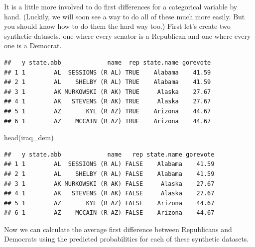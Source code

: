 \documentclass[
  12pt,
  oneside,openany]{book}
\newenvironment{Shaded}{\begin{snugshade}}{\end{snugshade}}
\newcommand{\ConstantTok}[1]{\textcolor[rgb]{0.00,0.00,0.00}{#1}}
\newcommand{\FunctionTok}[1]{\textcolor[rgb]{0.00,0.00,0.00}{#1}}
\newcommand{\NormalTok}[1]{#1}
\newcommand{\OtherTok}[1]{\textcolor[rgb]{0.56,0.35,0.01}{#1}}
\newcommand{\SpecialCharTok}[1]{\textcolor[rgb]{0.00,0.00,0.00}{#1}}
\begin{document}
It is a little more involved to do first differences for a categorical variable by hand.
(Luckily, we will soon see a way to do all of these much more easily.
But you should know how to do them the hard way too.)
First let's create two synthetic datasets, one where every senator is a Republican and one where every one is a Democrat.

\begin{Shaded}
\end{Shaded}

\begin{verbatim}
##   y state.abb             name  rep state.name gorevote
## 1 1        AL  SESSIONS (R AL) TRUE    Alabama    41.59
## 2 1        AL    SHELBY (R AL) TRUE    Alabama    41.59
## 3 1        AK MURKOWSKI (R AK) TRUE     Alaska    27.67
## 4 1        AK   STEVENS (R AK) TRUE     Alaska    27.67
## 5 1        AZ       KYL (R AZ) TRUE    Arizona    44.67
## 6 1        AZ    MCCAIN (R AZ) TRUE    Arizona    44.67
\end{verbatim}

\begin{Shaded}
\begin{Highlighting}[]
\FunctionTok{head}\NormalTok{(iraq\_dem)}
\end{Highlighting}
\end{Shaded}

\begin{verbatim}
##   y state.abb             name   rep state.name gorevote
## 1 1        AL  SESSIONS (R AL) FALSE    Alabama    41.59
## 2 1        AL    SHELBY (R AL) FALSE    Alabama    41.59
## 3 1        AK MURKOWSKI (R AK) FALSE     Alaska    27.67
## 4 1        AK   STEVENS (R AK) FALSE     Alaska    27.67
## 5 1        AZ       KYL (R AZ) FALSE    Arizona    44.67
## 6 1        AZ    MCCAIN (R AZ) FALSE    Arizona    44.67
\end{verbatim}

Now we can calculate the average first difference between Republicans and Democrats using the predicted probabilities for each of these synthetic datasets.
\end{document}
